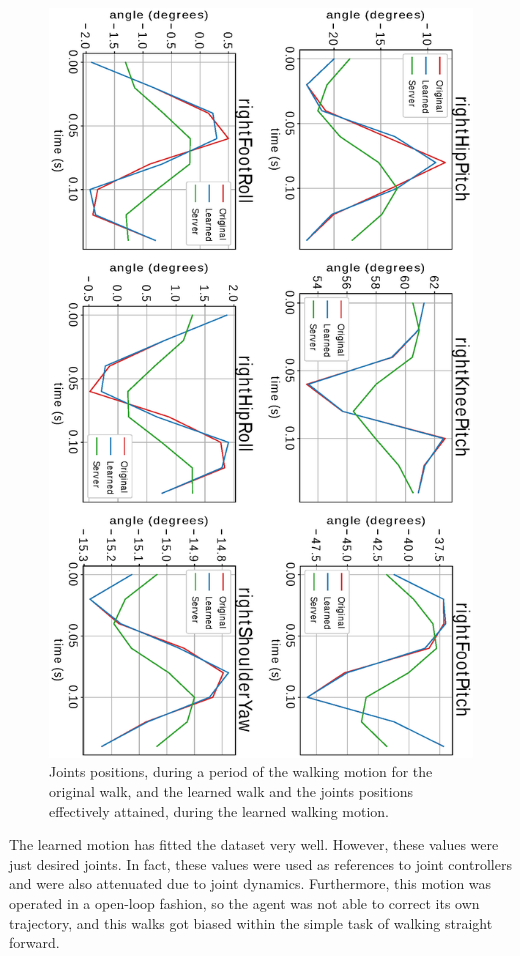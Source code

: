 \begin{figure}[!htbp]
\centering
\includegraphics[angle=90,width=1\textwidth]{Cap6/walk_joints_curves}
\caption{Joints positions, during a period of the walking motion for the original walk, and the learned walk and the joints positions effectively attained, during the learned walking motion.}
\label{fig:walk_joints_curves}
\end{figure}

The learned motion has fitted the dataset very well. However, these values were just desired joints. In fact, these values were used as references to joint controllers and were also attenuated due to joint dynamics. Furthermore, this motion was operated in a open-loop fashion, so the agent was not able to correct its own trajectory, and this walks got biased within the simple task of walking straight forward.


